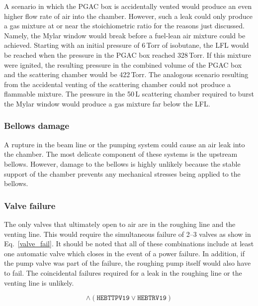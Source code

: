 A scenario in which the PGAC box is accidentally vented would produce an even higher flow rate of air into the chamber.  However, such a leak  could only produce a gas mixture at or near the stoichiometric ratio for the reasons just discussed.  Namely, the Mylar window would break before a fuel-lean air mixture could be achieved.  Starting with an initial pressure of 6\,Torr of isobutane, %
the LFL would be reached when the pressure in the PGAC box reached 328\,Torr. %
 If this mixture were ignited, the resulting pressure in the combined volume of the PGAC box and the scattering chamber would be 422\,Torr. %
   The analogous scenario resulting from the accidental venting of the scattering chamber could not produce a flammable mixture.  The pressure in the 50\,L scattering chamber required to burst the Mylar window would produce a gas mixture far below the LFL.

\subsubsection{Bellows damage }
A rupture in the beam line or the pumping system could cause an air leak into the chamber.  The most delicate component of these systems is the upstream bellows.  However, damage to the bellows is highly unlikely because the stable support of the chamber prevents any
mechanical stresses being applied to the bellows.

\subsubsection{Valve failure }
The only valves that ultimately open to air are in the roughing line and the venting line.  This would
require the simultaneous failure of 2--3 valves as show in Eq.~\ref{valve_fail}.  It should be noted that all of these combinations include at least one automatic valve which closes in the event of a power failure. %
In addition, if the pump valve was part of the failure, the roughing pump itself would also have to fail.  The coincidental failures required for a leak in the roughing line or the venting line is unlikely.

\begin{equation}
[\texttt{HEBTBV19} \lor (\texttt{HEBTRV19} \land \texttt{HEBTVV19A})] \land  (\texttt{HEBTTPV19} \lor \texttt{HEBTRV19})
\label{valve_fail}
\end{equation}

